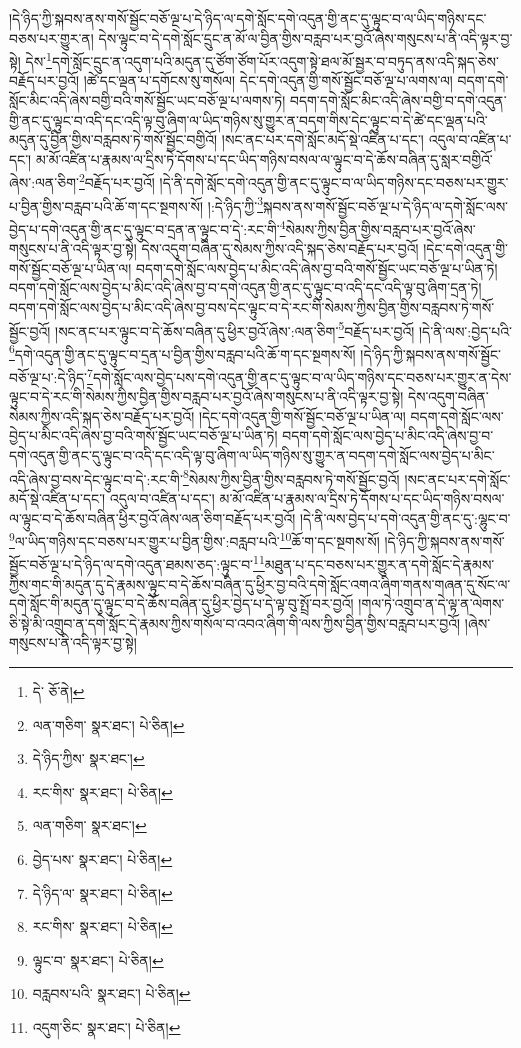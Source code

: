 །དེ་ཉིད་ཀྱི་སྐབས་ནས་གསོ་སྦྱོང་བཅོ་ལྔ་པ་དེ་ཉིད་ལ་དགེ་སློང་དགེ་འདུན་གྱི་ནང་དུ་ལྟུང་བ་ལ་ཡིད་གཉིས་དང་བཅས་པར་གྱུར་ན། དེས་ལྟུང་བ་དེ་དགེ་སློང་དྲུང་ན་མོ་ལ་བྱིན་གྱིས་བརླབ་པར་བྱའོ་ཞེས་གསུངས་པ་ནི་འདི་ལྟར་བྱ་སྟེ། དེས་\footnote{དེ་  ཅོ་ནེ། }དགེ་སློང་དྲུང་ན་འདུག་པའི་མདུན་དུ་ཙོག་ཙོག་པོར་འདུག་སྟེ་ཐལ་མོ་སྦྱར་བ་བཏུད་ནས་འདི་སྐད་ཅེས་བརྗོད་པར་བྱའོ། །ཚེ་དང་ལྡན་པ་དགོངས་སུ་གསོལ། དེང་དགེ་འདུན་གྱི་གསོ་སྦྱོང་བཅོ་ལྔ་པ་ལགས་ལ། བདག་དགེ་སློང་མིང་འདི་ཞེས་བགྱི་བའི་གསོ་སྦྱོང་ཡང་བཅོ་ལྔ་པ་ལགས་ཏེ། བདག་དགེ་སློང་མིང་འདི་ཞེས་བགྱི་བ་དགེ་འདུན་གྱི་ནང་དུ་ལྟུང་བ་འདི་དང་འདི་ལྟ་བུ་ཞིག་ལ་ཡིད་གཉིས་སུ་གྱུར་ན་བདག་གིས་དེང་ལྟུང་བ་དེ་ཚེ་དང་ལྡན་པའི་མདུན་དུ་བྱིན་གྱིས་བརླབས་ཏེ་གསོ་སྦྱོང་བགྱིའོ། །སང་ནང་པར་དགེ་སློང་མདོ་སྡེ་འཛིན་པ་དང་། འདུལ་བ་འཛིན་པ་དང་། མ་མོ་འཛིན་པ་རྣམས་ལ་དྲིས་ཏེ་དོགས་པ་དང་ཡིད་གཉིས་བསལ་ལ་ལྟུང་བ་དེ་ཆོས་བཞིན་དུ་སླར་བགྱིའོ་ཞེས་:ལན་ཅིག་\footnote{ལན་གཅིག་  སྣར་ཐང་།  པེ་ཅིན། }བརྗོད་པར་བྱའོ། །དེ་ནི་དགེ་སློང་དགེ་འདུན་གྱི་ནང་དུ་ལྟུང་བ་ལ་ཡིད་གཉིས་དང་བཅས་པར་གྱུར་པ་བྱིན་གྱིས་བརླབ་པའི་ཆོ་ག་དང་སྔགས་སོ། །:དེ་ཉིད་ཀྱི་\footnote{དེ་ཉིད་ཀྱིས་  སྣར་ཐང་། }སྐབས་ནས་གསོ་སྦྱོང་བཅོ་ལྔ་པ་དེ་ཉིད་ལ་དགེ་སློང་ལས་བྱེད་པ་དགེ་འདུན་གྱི་ནང་དུ་ལྟུང་བ་དྲན་ན་ལྟུང་བ་དེ་:རང་གི་\footnote{རང་གིས་  སྣར་ཐང་།  པེ་ཅིན། }སེམས་ཀྱིས་བྱིན་གྱིས་བརླབ་པར་བྱའོ་ཞེས་གསུངས་པ་ནི་འདི་ལྟར་བྱ་སྟེ། དེས་འདུག་བཞིན་དུ་སེམས་ཀྱིས་འདི་སྐད་ཅེས་བརྗོད་པར་བྱའོ། །དེང་དགེ་འདུན་གྱི་གསོ་སྦྱོང་བཅོ་ལྔ་པ་ཡིན་ལ། བདག་དགེ་སློང་ལས་བྱེད་པ་མིང་འདི་ཞེས་བྱ་བའི་གསོ་སྦྱོང་ཡང་བཅོ་ལྔ་པ་ཡིན་ཏེ། བདག་དགེ་སློང་ལས་བྱེད་པ་མིང་འདི་ཞེས་བྱ་བ་དགེ་འདུན་གྱི་ནང་དུ་ལྟུང་བ་འདི་དང་འདི་ལྟ་བུ་ཞིག་དྲན་ཏེ། བདག་དགེ་སློང་ལས་བྱེད་པ་མིང་འདི་ཞེས་བྱ་བས་དེང་ལྟུང་བ་དེ་རང་གི་སེམས་ཀྱིས་བྱིན་གྱིས་བརླབས་ཏེ་གསོ་སྦྱོང་བྱའོ། །སང་ནང་པར་ལྟུང་བ་དེ་ཆོས་བཞིན་དུ་ཕྱིར་བྱའོ་ཞེས་:ལན་ཅིག་\footnote{ལན་གཅིག་  སྣར་ཐང་། }བརྗོད་པར་བྱའོ། །དེ་ནི་ལས་:བྱེད་པའི་\footnote{བྱེད་པས་  སྣར་ཐང་།  པེ་ཅིན། }དགེ་འདུན་གྱི་ནང་དུ་ལྟུང་བ་དྲན་པ་བྱིན་གྱིས་བརླབ་པའི་ཆོ་ག་དང་སྔགས་སོ། །དེ་ཉིད་ཀྱི་སྐབས་ནས་གསོ་སྦྱོང་བཅོ་ལྔ་པ་:དེ་ཉིད་\footnote{དེ་ཉིད་ལ་  སྣར་ཐང་།  པེ་ཅིན། }དགེ་སློང་ལས་བྱེད་པས་དགེ་འདུན་གྱི་ནང་དུ་ལྟུང་བ་ལ་ཡིད་གཉིས་དང་བཅས་པར་གྱུར་ན་དེས་ལྟུང་བ་དེ་རང་གི་སེམས་ཀྱིས་བྱིན་གྱིས་བརླབ་པར་བྱའོ་ཞེས་གསུངས་པ་ནི་འདི་ལྟར་བྱ་སྟེ། དེས་འདུག་བཞིན་སེམས་ཀྱིས་འདི་སྐད་ཅེས་བརྗོད་པར་བྱའོ། །དེང་དགེ་འདུན་གྱི་གསོ་སྦྱོང་བཅོ་ལྔ་པ་ཡིན་ལ། བདག་དགེ་སློང་ལས་བྱེད་པ་མིང་འདི་ཞེས་བྱ་བའི་གསོ་སྦྱོང་ཡང་བཅོ་ལྔ་པ་ཡིན་ཏེ། བདག་དགེ་སློང་ལས་བྱེད་པ་མིང་འདི་ཞེས་བྱ་བ་དགེ་འདུན་གྱི་ནང་དུ་ལྟུང་བ་འདི་དང་འདི་ལྟ་བུ་ཞིག་ལ་ཡིད་གཉིས་སུ་གྱུར་ན་བདག་དགེ་སློང་ལས་བྱེད་པ་མིང་འདི་ཞེས་བྱ་བས་དེང་ལྟུང་བ་དེ་:རང་གི་\footnote{རང་གིས་  སྣར་ཐང་།  པེ་ཅིན། }སེམས་ཀྱིས་བྱིན་གྱིས་བརླབས་ཏེ་གསོ་སྦྱོང་བྱའོ། །སང་ནང་པར་དགེ་སློང་མདོ་སྡེ་འཛིན་པ་དང་། འདུལ་བ་འཛིན་པ་དང་། མ་མོ་འཛིན་པ་རྣམས་ལ་དྲིས་ཏེ་དོགས་པ་དང་ཡིད་གཉིས་བསལ་ལ་ལྟུང་བ་དེ་ཆོས་བཞིན་ཕྱིར་བྱའོ་ཞེས་ལན་ཅིག་བརྗོད་པར་བྱའོ། །དེ་ནི་ལས་བྱེད་པ་དགེ་འདུན་གྱི་ནང་དུ་:ལྷུང་བ་\footnote{ལྟུང་བ་  སྣར་ཐང་།  པེ་ཅིན། }ལ་ཡིད་གཉིས་དང་བཅས་པར་གྱུར་པ་བྱིན་གྱིས་:བརླབ་པའི་\footnote{བརླབས་པའི་  སྣར་ཐང་།  པེ་ཅིན། }ཆོ་ག་དང་སྔགས་སོ། །དེ་ཉིད་ཀྱི་སྐབས་ནས་གསོ་སྦྱོང་བཅོ་ལྔ་པ་དེ་ཉིད་ལ་དགེ་འདུན་ཐམས་ཅད་:ལྟུང་བ་\footnote{འདུག་ཅིང་  སྣར་ཐང་།  པེ་ཅིན། }མཐུན་པ་དང་བཅས་པར་གྱུར་ན་དགེ་སློང་དེ་རྣམས་ཀྱིས་གང་གི་མདུན་དུ་དེ་རྣམས་ལྟུང་བ་དེ་ཆོས་བཞིན་དུ་ཕྱིར་བྱ་བའི་དགེ་སློང་འགའ་ཞིག་གནས་གཞན་དུ་སོང་ལ་དགེ་སློང་གི་མདུན་དུ་ལྟུང་བ་དེ་ཆོས་བཞིན་དུ་ཕྱིར་བྱེད་པ་དེ་ལྟ་བུ་སྤྲོ་བར་བྱའོ། །གལ་ཏེ་འགྲུབ་ན་དེ་ལྟ་ན་ལེགས་ཅི་སྟེ་མི་འགྲུབ་ན་དགེ་སློང་དེ་རྣམས་ཀྱིས་གསོལ་བ་འབའ་ཞིག་གི་ལས་ཀྱིས་བྱིན་གྱིས་བརླབ་པར་བྱའོ། །ཞེས་གསུངས་པ་ནི་འདི་ལྟར་བྱ་སྟེ། 